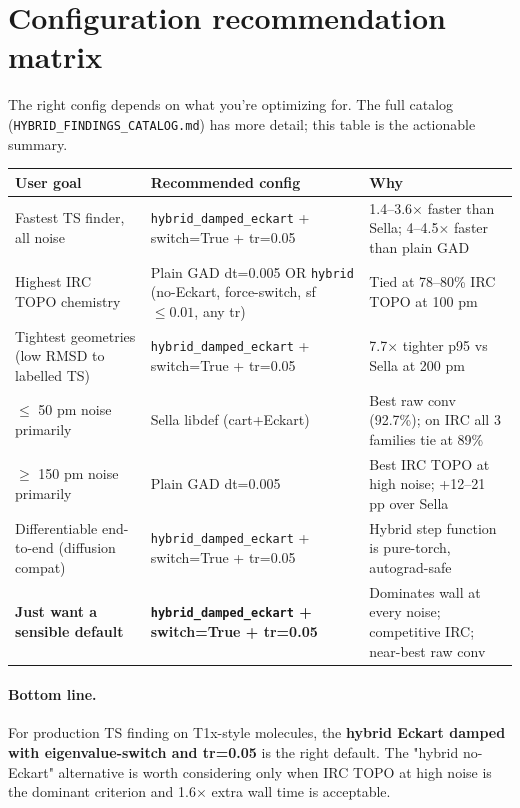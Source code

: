 \documentclass[11pt]{article}
\begin{document}
\section*{Configuration recommendation matrix}

The right config depends on what you're optimizing for. The full
catalog (\texttt{HYBRID\_FINDINGS\_CATALOG.md}) has more detail; this
table is the actionable summary.

\begin{center}\small
\begin{tabular}{p{}|p{}|p{}}
\toprule
\textbf{User goal} & \textbf{Recommended config} & \textbf{Why} \\
\midrule
Fastest TS finder, all noise & \texttt{hybrid\_damped\_eckart} + switch=True + tr=0.05 & 1.4--3.6$\times$ faster than Sella; 4--4.5$\times$ faster than plain GAD \\
\midrule
Highest IRC TOPO chemistry & Plain GAD dt=0.005 OR \texttt{hybrid} (no-Eckart, force-switch, sf $\le 0.01$, any tr) & Tied at 78--80\% IRC TOPO at 100 pm \\
\midrule
Tightest geometries (low RMSD to labelled TS) & \texttt{hybrid\_damped\_eckart} + switch=True + tr=0.05 & 7.7$\times$ tighter p95 vs Sella at 200 pm \\
\midrule
$\le$ 50 pm noise primarily & Sella libdef (cart+Eckart) & Best raw conv (92.7\%); on IRC all 3 families tie at 89\% \\
\midrule
$\ge$ 150 pm noise primarily & Plain GAD dt=0.005 & Best IRC TOPO at high noise; +12--21 pp over Sella \\
\midrule
Differentiable end-to-end (diffusion compat) & \texttt{hybrid\_damped\_eckart} + switch=True + tr=0.05 & Hybrid step function is pure-torch, autograd-safe \\
\midrule
\textbf{Just want a sensible default} & \textbf{\texttt{hybrid\_damped\_eckart} + switch=True + tr=0.05} & Dominates wall at every noise; competitive IRC; near-best raw conv \\
\bottomrule
\end{tabular}
\end{center}

\paragraph{Bottom line.} For production TS finding on T1x-style
molecules, the \textbf{hybrid Eckart damped with eigenvalue-switch and
tr=0.05} is the right default. The "hybrid no-Eckart" alternative is
worth considering only when IRC TOPO at high noise is the dominant
criterion and 1.6$\times$ extra wall time is acceptable.
\end{document}
